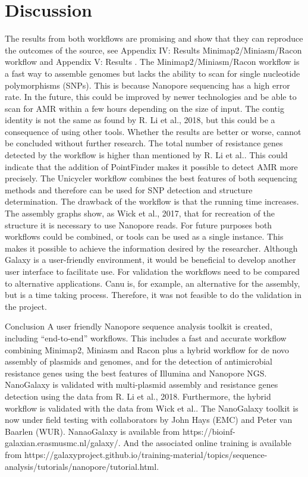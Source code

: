 \documentclass[a4paper,num-refs]{oup-contemporary}
\begin{document}
\section{Discussion}
The results from both workflows are promising and show that they can reproduce the outcomes of
the source, see Appendix IV: Results Minimap2/Miniasm/Racon workflow and Appendix V: Results .
The Minimap2/Miniasm/Racon workflow is a fast way to assemble genomes but lacks the ability to
scan for single nucleotide polymorphisms (SNPs). This is because Nanopore sequencing has a high
error rate. In the future, this could be improved by newer technologies and be able to scan for AMR
within a few hours depending on the size of input. The contig identity is not the same as found by R.
Li et al., 2018, but this could be a consequence of using other tools. Whether the results are better
or worse, cannot be concluded without further research. The total number of resistance genes
detected by the workflow is higher than mentioned by R. Li et al.. This could indicate that the
addition of PointFinder makes it possible to detect AMR more precisely. The Unicycler workflow
combines the best features of both sequencing methods and therefore can be used for SNP
detection and structure determination. The drawback of the workflow is that the running time
increases. The assembly graphs show, as Wick et al., 2017, that for recreation of the structure it is
necessary to use Nanopore reads. For future purposes both workflows could be combined, or tools
can be used as a single instance. This makes it possible to achieve the information desired by the
researcher. Although Galaxy is a user-friendly environment, it would be beneficial to develop
another user interface to facilitate use. For validation the workflows need to be compared to
alternative applications. Canu is, for example, an alternative for the assembly, but is a time taking
process. Therefore, it was not feasible to do the validation in the project.

Conclusion
A user friendly Nanopore sequence analysis toolkit is created, including “end-to-end” workflows. This includes a fast and accurate workflow combining Minimap2, Miniasm and Racon plus a hybrid workflow for de novo assembly of plasmids and genomes, and for the detection of antimicrobial resistance genes using the best features of Illumina and Nanopore NGS. NanoGalaxy is validated with multi-plasmid assembly and resistance genes detection using the data from R. Li et al., 2018. Furthermore, the hybrid workflow is validated with the data from Wick et al.. The NanoGalaxy toolkit is now under field testing with collaborators by John Hays (EMC) and Peter van Baarlen (WUR). NanaoGalaxy is available from https://bioinf-galaxian.erasmusmc.nl/galaxy/. And the associated online training is available from https://galaxyproject.github.io/training-material/topics/sequence-analysis/tutorials/nanopore/tutorial.html.
\end{document}
